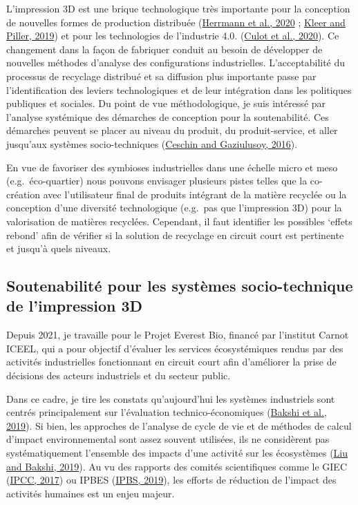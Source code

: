 \documentclass[
  12pt,
  oneside]{book}
\begin{document}
L'impression 3D est une brique technologique très importante pour la conception de nouvelles formes de production distribuée (\protect\hyperlink{ref-Herrmann2020}{Herrmann et al., 2020} ; \protect\hyperlink{ref-Kleer2019}{Kleer and Piller, 2019}) et pour les technologies de l'industrie 4.0. (\protect\hyperlink{ref-Culot2020}{Culot et al., 2020}). Ce changement dans la façon de fabriquer conduit au besoin de développer de nouvelles méthodes d'analyse des configurations industrielles.
L'acceptabilité du processus de recyclage distribué et sa diffusion plus importante passe par l'identification des leviers technologiques et de leur intégration dans les politiques publiques et sociales. Du point de vue méthodologique, je suis intéressé par l'analyse systémique des démarches de conception pour la soutenabilité. Ces démarches peuvent se placer au niveau du produit, du produit-service, et aller jusqu'aux systèmes socio-techniques (\protect\hyperlink{ref-Ceschin2016}{Ceschin and Gaziulusoy, 2016}).

En vue de favoriser des symbioses industrielles dans une échelle micro et meso (e.g.~éco-quartier) nous pouvons envisager plusieurs pistes telles que la co-création avec l'utilisateur final de produits intégrant de la matière recyclée ou la conception d'une diversité technologique (e.g.~pas que l'impression 3D) pour la valorisation de matières recyclées.
Cependant, il faut identifier les possibles `effets rebond' afin de vérifier si la solution de recyclage en circuit court est pertinente et jusqu'à quels niveaux.

\hypertarget{soutenabilituxe9-pour-les-systuxe8mes-socio-technique-de-limpression-3d}{%
\subsection{Soutenabilité pour les systèmes socio-technique de l'impression 3D}\label{soutenabilituxe9-pour-les-systuxe8mes-socio-technique-de-limpression-3d}}

Depuis 2021, je travaille pour le Projet Everest Bio, financé par l'institut Carnot ICEEL, qui a pour objectif d'évaluer les services écosystémiques rendus par des activités industrielles fonctionnant en circuit court afin d'améliorer la prise de décisions des acteurs industriels et du secteur public.

Dans ce cadre, je tire les constats qu'aujourd'hui les systèmes industriels sont centrés principalement sur l'évaluation technico-économiques (\protect\hyperlink{ref-Bakshi2019b}{Bakshi et al., 2019}). Si bien, les approches de l'analyse de cycle de vie et de méthodes de calcul d'impact environnemental sont assez souvent utilisées, ils ne considèrent pas systématiquement l'ensemble des impacts d'une activité sur les écosystèmes (\protect\hyperlink{ref-Liu2019g}{Liu and Bakshi, 2019}). Au vu des rapports des comités scientifiques comme le GIEC (\protect\hyperlink{ref-IPCC2017}{IPCC, 2017}) ou IPBES (\protect\hyperlink{ref-IPBS2019}{IPBS, 2019}), les efforts de réduction de l'impact des activités humaines est un enjeu majeur.
\end{document}
